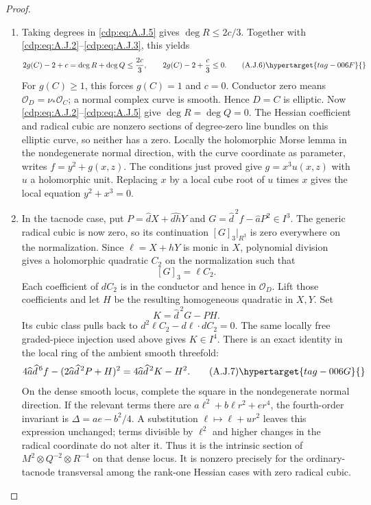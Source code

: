 \begin{proof}
\begin{enumerate}[label=\arabic*.,leftmargin=*]
\item Taking degrees in \eqref{cdp:eq:A.J.5} gives $\deg R\leq2c/3$.
Together with \eqref{cdp:eq:A.J.2}--\eqref{cdp:eq:A.J.3}, this yields
\[
 2g(C)-2+c=\deg R+\deg Q\leq\frac{2c}{3},
 \qquad 2g(C)-2+\frac c3\leq0.                     \tag{A.J.6}\hypertarget{tag-006F}{}\label{cdp:eq:A.J.6}
\]
For $g(C)\geq1$, this forces $g(C)=1$ and $c=0$.
Conductor zero means $\mathcal O_D=\nu_*\mathcal O_C$;
a normal complex curve is smooth. Hence $D=C$ is elliptic.
Now \eqref{cdp:eq:A.J.2}--\eqref{cdp:eq:A.J.5} give $\deg R=\deg Q=0$.
The Hessian coefficient and radical cubic are nonzero
sections of degree-zero line bundles on this elliptic curve,
so neither has a zero. Locally the holomorphic Morse lemma
in the nondegenerate normal direction, with the curve
coordinate as parameter, writes $f=y^2+g(x,z)$.
The conditions just proved give $g=x^3u(x,z)$ with $u$ a
holomorphic unit. Replacing $x$ by a local cube root of $u$
times $x$ gives the local equation $y^2+x^3=0$.

\item In the tacnode case, put $P=\widehat d X+\widehat{dh}Y$ and
$G=\widehat d^{\,2}f-\widehat aP^2\in I^3$.
The generic radical cubic is now zero, so its continuation
$[G]_3|_{R^3}$ is zero everywhere on the normalization.
Since $\ell=X+hY$ is monic in $X$, polynomial division gives
a holomorphic quadratic $C_2$ on the normalization
such that
\[
 [G]_3=\ell C_2.
\]
Each coefficient of $dC_2$ is in the conductor and hence in
$\mathcal O_D$. Lift those coefficients and let $H$ be the
resulting homogeneous quadratic in $X,Y$. Set
\[
 K=\widehat d^{\,2}G-PH.
\]
Its cubic class pulls back to
$d^2\ell C_2-d\ell\cdot dC_2=0$.
The same locally free graded-piece injection used above gives
$K\in I^4$. There is an exact identity in the local ring of
the ambient smooth threefold:
\[
 4\widehat a\widehat d^{\,6}f
 -(2\widehat a\widehat d^{\,2}P+H)^2
 =4\widehat a\widehat d^{\,2}K-H^2.               \tag{A.J.7}\hypertarget{tag-006G}{}\label{cdp:eq:A.J.7}
\]
On the dense smooth locus, complete the square in the
nondegenerate normal direction. If the relevant terms there
are $a\ell^2+b\ell r^2+er^4$, the fourth-order invariant is
$\Delta=ae-b^2/4$. A substitution
$\ell\mapsto\ell+ur^2$ leaves this expression unchanged;
terms divisible by $\ell^2$ and higher changes in the radical
coordinate do not alter it. Thus it is the intrinsic section
of $M^2\otimes Q^{-2}\otimes R^{-4}$ on that dense locus.
It is nonzero precisely for the ordinary-tacnode transversal
among the rank-one Hessian cases with zero radical cubic.


\end{enumerate}
\end{proof}
